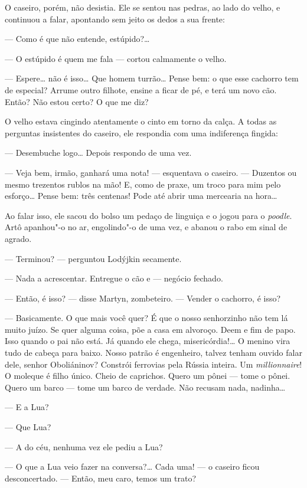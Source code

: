 O caseiro, porém, não desistia. Ele se sentou nas pedras, ao lado do
velho, e continuou a falar, apontando sem jeito os dedos a sua frente:

--- Como é que não entende, estúpido?\ldots{}

--- O estúpido é quem me fala --- cortou calmamente o velho.

--- Espere\ldots{} não é isso\ldots{} Que homem turrão\ldots{} Pense bem: o que esse
cachorro tem de especial? Arrume outro filhote, ensine a ficar de pé, e
terá um novo cão. Então? Não estou certo? O que me diz?

O velho estava cingindo atentamente o cinto em torno da calça. A todas
as perguntas insistentes do caseiro, ele respondia com uma indiferença
fingida:

--- Desembuche logo\ldots{} Depois respondo de uma vez.

--- Veja bem, irmão, ganhará uma nota! --- esquentava o caseiro. ---
Duzentos ou mesmo trezentos rublos na mão! E, como de praxe, um troco
para mim pelo esforço\ldots{} Pense bem: três centenas! Pode até abrir uma
mercearia na hora\ldots{}

Ao falar isso, ele sacou do bolso um pedaço de linguiça e o jogou para o
\emph{poodle}. Artô apanhou"-o no ar, engolindo"-o de uma vez, e abanou o
rabo em sinal de agrado.

--- Terminou? --- perguntou Lodýjkin secamente.

--- Nada a acrescentar. Entregue o cão e --- negócio fechado.

--- Então, é isso? --- disse Martyn, zombeteiro. --- Vender o cachorro,
é isso?

--- Basicamente. O que mais você quer? É que o nosso senhorzinho não tem
lá muito juízo. Se quer alguma coisa, põe a casa em alvoroço. Deem e fim
de papo. Isso quando o pai não está. Já quando ele chega,
misericórdia!\ldots{} O menino vira tudo de cabeça para baixo. Nosso patrão é
engenheiro, talvez tenham ouvido falar dele, senhor Oboliáninov?
Constrói ferrovias pela Rússia inteira. Um \emph{millionnaire}! O moleque
é filho único. Cheio de caprichos. Quero um pônei --- tome o pônei.
Quero um barco --- tome um barco de verdade. Não recusam nada,
nadinha\ldots{}

--- E a Lua?

--- Que Lua?

--- A do céu, nenhuma vez ele pediu a Lua?

--- O que a Lua veio fazer na conversa?\ldots{} Cada uma! --- o caseiro ficou
desconcertado. --- Então, meu caro, temos um trato?


